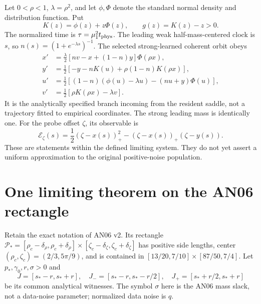 \documentclass[11pt]{article}
\numberwithin{equation}{section}
\theoremstyle{remark}\newtheorem{remark}[theorem]{Remark}
\begin{document}
Let $0<\rho<1$, $\lambda=\rho^2$, and let $\phi,\Phi$ denote the standard
normal density and distribution function. Put
\[
 K(z)=\phi(z)+z\Phi(z),\qquad g(z)=K(z)-z>0.
\]
The normalized time is $\tau=\mu_1^2t_{\rm phys}$. The leading weak
half-mass-centered clock is $s$, so
$n(s)=(1+e^{-\lambda s})^{-1}$. The selected strong-learned coherent orbit
obeys
\begin{align}
 x'&=\frac\lambda2[nv-x+(1-n)y]\Phi(\rho x),\nonumber\\
 y'&=\frac12[-y-nK(u)+\rho(1-n)K(\rho x)],\nonumber\\
 u'&=\frac12[(1-n)(\phi(u)-\lambda u)-(nu+y)\Phi(u)],\nonumber\\
 v'&=\frac12[\rho K(\rho x)-\lambda v].
 \label{inc:LPR:v1:orbit}
\end{align}
It is the analytically specified branch incoming from the resident saddle,
not a trajectory fitted to empirical coordinates. The strong leading mass
is identically one. For the probe offset $\zeta$, its observable is
\begin{equation}\label{inc:LPR:v1:error}
 \mathcal E_\zeta(s)=\frac12(\zeta-x(s))_+^2
 -(\zeta-x(s))_+(\zeta-y(s)).
\end{equation}
These are statements within the defined limiting system. They do not yet
assert a uniform approximation to the original positive-noise population.

\section{One limiting theorem on the AN06 rectangle}
\label{inc:LPR:v1:combined}
Retain the exact notation of AN06 v2. Its rectangle
$\mathcal P_*=[\rho_c-\delta_\rho,\rho_c+\delta_\rho]
\times[\zeta_c-\delta_\zeta,\zeta_c+\delta_\zeta]$ has positive side
lengths, center $(\rho_c,\zeta_c)=(2/3,5\pi/9)$, and is contained in
$[13/20,7/10]\times[87/50,7/4]$. Let $p_*,\gamma_0,r,\sigma>0$ and
\[
 J=[s_*-r,s_*+r],\quad
 J_-=[s_*-r,s_*-r/2],\quad
 J_+=[s_*+r/2,s_*+r]
\]
be its common analytical witnesses. The symbol $\sigma$ here is the AN06
mass slack, not a data-noise parameter; normalized data noise is $q$.
\end{document}
